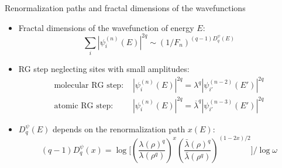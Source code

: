 \documentclass[xcolor=x11names,compress,professionalfonts]{beamer}
\renewcommand{\(}{\begin{columns}}
\renewcommand{\)}{\end{columns}}
\newcommand{\<}[1]{\begin{column}{#1}}
\renewcommand{\>}{\end{column}}
\newcommand{\lb}{\ensuremath{\overline{\lambda}}}
\begin{document}
\begin{frame}{Renormalization paths and fractal dimensions of the wavefunctions}
\begin{itemize}
	\item Fractal dimensions of the wavefunction of energy $E$:
	\[ \sum_i |\psi_i^{(n)}(E)|^{2q} \sim (1/F_n)^{(q-1)D_q^\psi(E)}  \]
	\item RG step neglecting sites with small amplitudes:
		\begin{align*}
			\text{molecular RG step:~} &|\psi_i^{(n)}(E)|^{2q} = \lambda^q |\psi_{i'}^{(n-2)}(E')|^{2q} \\
			\text{atomic RG step:~} &|\psi_i^{(n)}(E)|^{2q} = \lb^q |\psi_{i'}^{(n-3)}(E')|^{2q}
		\end{align*}
	\item $D_q^\psi(E)$ depends on the renormalization path $x(E)$:
	\[ (q-1)D_q^\psi(x) = \log \Bigg[ \left( \frac{\lambda(\rho)^q}{\lambda(\rho^q)} \right)^x \left( \frac{\bar{\lambda}(\rho)^q}{\bar{\lambda}(\rho^q)} \right)^{(1-2x)/2} \Bigg]/\log \omega \]
\end{itemize}
\end{frame}
\end{document}
